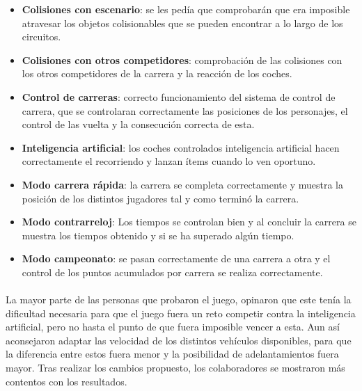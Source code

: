 \begin{itemize}
    \item \textbf{Colisiones con escenario}: se les pedía que comprobarán que era imposible atravesar los objetos colisionables
    que se pueden encontrar a lo largo de los circuitos.
    
    \item \textbf{Colisiones con otros competidores}: comprobación de las colisiones con los otros competidores de la carrera y la
    reacción de los coches.
    
    \item \textbf{Control de carreras}: correcto funcionamiento del sistema de control de carrera, que se controlaran 
    correctamente las posiciones de los personajes, el control de las vuelta y la consecución correcta de esta.
    
    \item \textbf{Inteligencia artificial}: los coches controlados inteligencia artificial hacen correctamente el recorriendo y 
    lanzan ítems cuando lo ven oportuno.
    
    \item \textbf{Modo carrera rápida}: la carrera se completa correctamente y muestra la posición de los distintos jugadores tal 
    y como terminó la carrera.
    
    \item \textbf{Modo contrarreloj}: Los tiempos se controlan bien y al concluir la carrera se muestra los tiempos obtenido y si se
    ha superado algún tiempo.
    
    \item \textbf{Modo campeonato}: se pasan correctamente de una carrera a otra y el control de los puntos acumulados por carrera
    se realiza correctamente.
\end{itemize}

\paragraph{}
La mayor parte de las personas que probaron el juego, opinaron que este tenía la dificultad necesaria para que el juego fuera un 
reto competir contra la inteligencia artificial, pero no hasta el punto de que fuera imposible vencer a esta. Aun así aconsejaron
adaptar las velocidad de los distintos vehículos disponibles, para que la diferencia entre estos fuera menor y la posibilidad
de adelantamientos fuera mayor. Tras realizar los cambios propuesto, los colaboradores se mostraron más contentos con los resultados.

